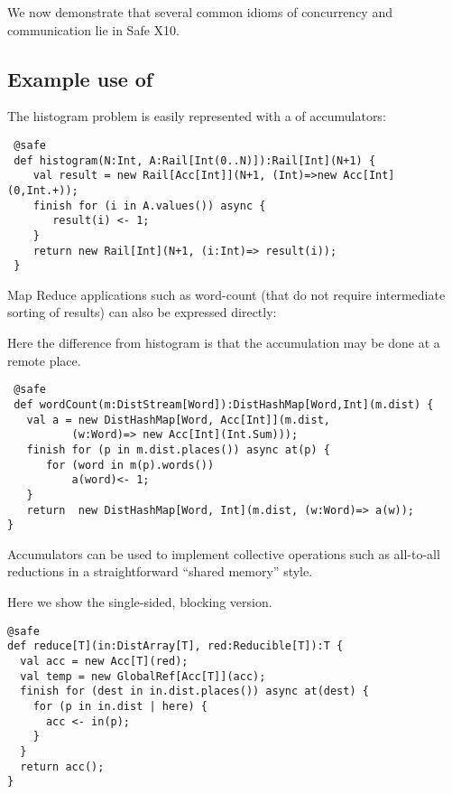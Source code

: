 We now demonstrate that several common idioms of concurrency and
communication lie in Safe X10.

\subsection{Example use of }
\begin{example}[Histogram]
The histogram problem is easily represented with a  of
accumulators: 
\begin{lstlisting}
 @safe
 def histogram(N:Int, A:Rail[Int(0..N)]):Rail[Int](N+1) {
    val result = new Rail[Acc[Int]](N+1, (Int)=>new Acc[Int](0,Int.+));
    finish for (i in A.values()) async {
       result(i) <- 1;
    }
    return new Rail[Int](N+1, (i:Int)=> result(i));
 }
\end{lstlisting}
\end{example}

Map Reduce applications such as word-count (that do not require
intermediate sorting of results) can also be expressed directly:
\begin{example}
Here the difference from histogram is that the accumulation may be
done at a remote place. 
\begin{lstlisting}
 @safe
 def wordCount(m:DistStream[Word]):DistHashMap[Word,Int](m.dist) {
   val a = new DistHashMap[Word, Acc[Int]](m.dist,
          (w:Word)=> new Acc[Int](Int.Sum)));
   finish for (p in m.dist.places()) async at(p) {
      for (word in m(p).words())
          a(word)<- 1;
   }
   return  new DistHashMap[Word, Int](m.dist, (w:Word)=> a(w));
}
\end{lstlisting}

\end{example}


Accumulators can be used to implement collective operations such as
all-to-all reductions in a straightforward ``shared memory'' style.

\begin{example}
Here we show the single-sided, blocking version.
  \begin{lstlisting}
@safe
def reduce[T](in:DistArray[T], red:Reducible[T]):T {
  val acc = new Acc[T](red);
  val temp = new GlobalRef[Acc[T]](acc);
  finish for (dest in in.dist.places()) async at(dest) {
    for (p in in.dist | here) {
      acc <- in(p);
    }
  }
  return acc();
}
\end{lstlisting}
\end{example}

